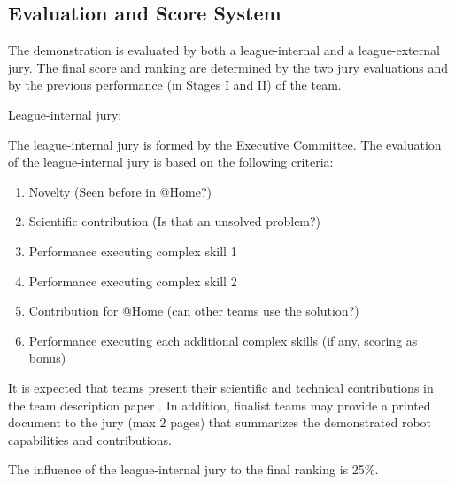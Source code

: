 \subsection{Evaluation and Score System}
The demonstration is evaluated by both a league-internal and a league-external jury. The final score and ranking are determined by the two jury evaluations and by the previous performance (in Stages I and II) of the team.

\begin{enumerate}
  {\bf\item League-internal jury:} The league-internal jury is formed by the Executive Committee.
  The evaluation of the league-internal jury is based on the following criteria:
  \begin{enumerate}
    \item Novelty (Seen before in @Home?)
    \item Scientific contribution (Is that an unsolved problem?)
    \item Performance executing complex skill 1
    \item Performance executing complex skill 2
    \item Contribution for @Home (can other teams use the solution?)
    \item Performance executing each additional complex skills (if any, scoring as bonus)

  \end{enumerate}
  It is expected that teams present their scientific and technical contributions in
  the team description paper .
  In addition, finalist teams may provide a printed document to the jury (max 2 pages) that summarizes the demonstrated robot capabilities and contributions.

  The influence of the league-internal jury to the final ranking is 25\%. \\


\end{enumerate}
